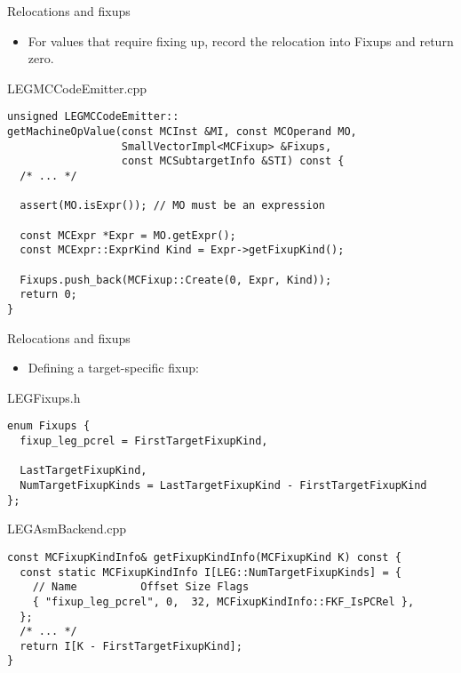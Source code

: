 
\begin{frame}[fragile]{Relocations and fixups}

\begin{itemize}
    \item For values that require fixing up, record the relocation into Fixups and return zero.
\end{itemize}

\begin{block}{LEGMCCodeEmitter.cpp}
\begin{lstlisting}
unsigned LEGMCCodeEmitter::
getMachineOpValue(const MCInst &MI, const MCOperand MO,
                  SmallVectorImpl<MCFixup> &Fixups,
                  const MCSubtargetInfo &STI) const {
  /* ... */

  assert(MO.isExpr()); // MO must be an expression
  
  const MCExpr *Expr = MO.getExpr();
  const MCExpr::ExprKind Kind = Expr->getFixupKind();

  Fixups.push_back(MCFixup::Create(0, Expr, Kind));
  return 0;
}
\end{lstlisting}
\end{block}

\end{frame}


\begin{frame}[fragile]{Relocations and fixups}

\begin{itemize}
    \item Defining a target-specific fixup:
\end{itemize}

\begin{block}{LEGFixups.h}
\begin{lstlisting}
enum Fixups {
  fixup_leg_pcrel = FirstTargetFixupKind,
  
  LastTargetFixupKind,
  NumTargetFixupKinds = LastTargetFixupKind - FirstTargetFixupKind
};
\end{lstlisting}
\end{block}

\begin{block}{LEGAsmBackend.cpp}
\begin{lstlisting}
const MCFixupKindInfo& getFixupKindInfo(MCFixupKind K) const {
  const static MCFixupKindInfo I[LEG::NumTargetFixupKinds] = {
    // Name          Offset Size Flags
    { "fixup_leg_pcrel", 0,  32, MCFixupKindInfo::FKF_IsPCRel },
  };
  /* ... */
  return I[K - FirstTargetFixupKind];
}
\end{lstlisting}
\end{block}

\end{frame}

